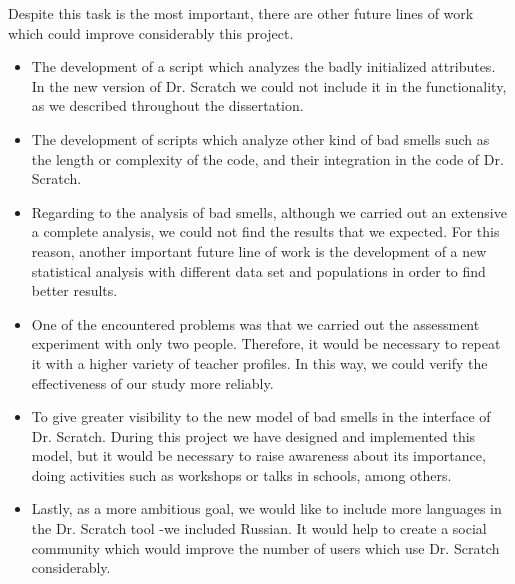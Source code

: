 Despite this task is the most important, there are other future lines of work which could improve considerably this project.

\begin{itemize}
    \item The development of a script which analyzes the badly initialized attributes. In the new version of Dr. Scratch we could not include it in the functionality, as we described throughout the dissertation. 
    \item The development of scripts which analyze other kind of bad smells such as the length or complexity of the code, and their integration in the code of Dr. Scratch. 
    \item Regarding to the analysis of bad smells, although we carried out an extensive a complete analysis, we could not find the results that we expected. For this reason, another important future line of work is the development of a new statistical analysis with different data set and populations in order to find better results. 
    \item One of the encountered problems was that we carried out the assessment experiment with only two people. Therefore, it would be necessary to repeat it with a higher variety of teacher profiles. In this way, we could verify the effectiveness of our study more reliably.
    \item To give greater visibility to the new model of bad smells in the interface of Dr. Scratch. During this project we have designed and implemented this model, but it would be necessary to raise awareness about its importance, doing activities such as workshops or talks in schools, among others.
    \item Lastly, as a more ambitious goal, we would like to include more languages in the Dr. Scratch tool -we included Russian. It would help to create a social community which would improve the number of users which use Dr. Scratch considerably. 
\end{itemize}
